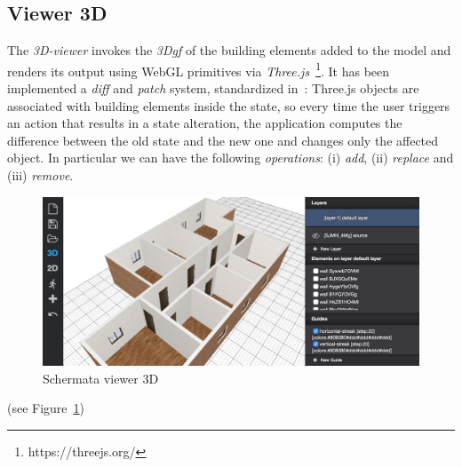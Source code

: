 \subsection{Viewer 3D}
The \emph{3D-viewer} invokes the \emph{3Dgf} of the building elements added to the model and renders its output using WebGL primitives via \emph{Three.js}~\footnote{https://threejs.org/}. It has been implemented a \emph{diff} and \emph{patch} system, standardized in~\cite{rfc6902}: Three.js objects are associated with building elements inside the state, so every time the user triggers an action that results in a state alteration, the application computes the difference between the old state and the new one and changes only the affected object. In particular we can have the following \textit{operations}: (i) \emph{add}, (ii) \emph{replace} and (iii) \emph{remove}.
\begin{figure}[htbp] %
   \centering
   \includegraphics[width=1\linewidth]{images/3d}
   \caption{Schermata viewer 3D }
   \label{fig:viewer3D}
\end{figure}
   (see Figure~\ref{fig:viewer3D})
   \newpage
